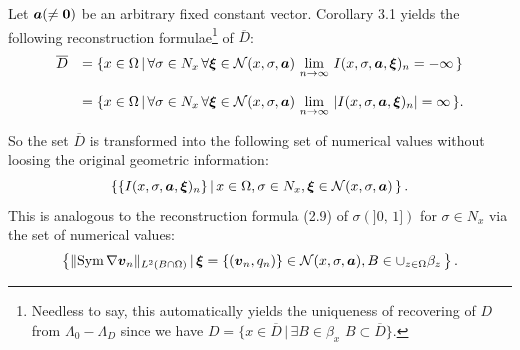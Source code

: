 Let $\mbox{\boldmath $a$}(\not=\mbox{\boldmath $0$})$ be an arbitrary fixed constant vector.
Corollary 3.1 yields the following  reconstruction formulae\footnote{Needless to say, this automatically yields the uniqueness of recovering of $D$ from $\Lambda_0-\Lambda_D$
since we have $D=\{x\in\overline{D}\,\vert\, \exists B\in\beta_x\,\, B\subset\overline{D}\}$.}
of $\overline{D}$:
$$\begin{array}{ll}
\displaystyle
\overline{D}
&
\displaystyle
=\{x\in\Omega\,\vert\,\forall\sigma\in N_x\,\forall\mbox{\boldmath $\xi$}\in{\cal N}(x,\sigma,\mbox{\boldmath $a$})\,
\lim_{n\rightarrow\infty}\,I(x,\sigma,\mbox{\boldmath $a$},\mbox{\boldmath $\xi$})_n=-\infty\,\}
\\
\\
\displaystyle
&
\displaystyle
=\{x\in\Omega\,\vert\,\forall\sigma\in N_x\,\forall\mbox{\boldmath $\xi$}\in{\cal N}(x,\sigma,\mbox{\boldmath $a$})\,
\lim_{n\rightarrow\infty}\,\vert I(x,\sigma,\mbox{\boldmath $a$},\mbox{\boldmath $\xi$})_n\vert=\infty\,\}.
\end{array}
$$



  
So the set $\overline{D}$ is transformed into the following set of numerical values without loosing the original geometric information:
$$\displaystyle
\left\{
\{I(x,\sigma,\mbox{\boldmath $a$},\mbox{\boldmath $\xi$})_n\}
\,\vert\,x\in\Omega,\sigma\in N_x, \mbox{\boldmath $\xi$}\in{\cal N}(x,\sigma,\mbox{\boldmath $a$})\,\right\}.
$$
This is analogous to the reconstruction formula  (2.9) of  $\sigma(]0,\,1])$ for $\sigma\in N_x$ via the 
set of numerical values:
$$\displaystyle
\left\{\Vert\text{Sym}\,\nabla\mbox{\boldmath $v$}_n\Vert_{L^2(B\cap\Omega)}\,\vert\,
\mbox{\boldmath $\xi$}=\{(\mbox{\boldmath $v$}_n,q_n)\}\in{\cal N}(x,\sigma,\mbox{\boldmath $a$}),
B\in\cup_{z\in\Omega} \beta_z\,\right\}.
$$



































